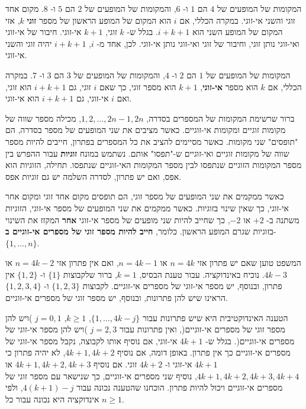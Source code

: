 \documentclass[12pt,a4paper]{article}
\begin{document}
המקומות של המופעים של
$4$
הם
$1$
ו-
$6$,
והמקומות של המופעים של
$2$
הם
$5$
ו-
$8$.
מקום אחד זוגי והשני אי-זוגי. במקרה הכללי, אם
$i$
הוא המקום של המופע הראשון של מספר
\textbf{זוגי}
$k$,
אזי המקום של המופע השני הוא
$i+k+1$.
בגלל ש-
$k$
זוגי,
$k+1$
אי-זוגי. חיבור של אי-זוגי ואי-זוגי נותן זוגי, וחיבור של זוגי ואי-זוגי נותן אי-זוגי. לכן, אחד מ-
$i$, $i+k+1$
יהיה זוגי והשני אי-זוגי.


המקומות של המופעים של
$1$
הם
$2$
ו-
$4$,
והמקומות של המופעים של
$3$
הם
$3$
ו-
$7$.
במקרה הכללי, אם
$k$
הוא מספר
\textbf{אי-זוגי},
$k+1$
הוא מספר זוגי, כך שאם
$i$
זוגי, גם
$i+k+1$
הוא זוגי, ואם
$i$
אי-זוגי, גם
$i+k+1$
הוא אי-זוגי.

ברור שרשימת המקומות של המספרים בסדרה,
$1,2,\ldots,2n-1,2n$,
מכילה מספר שווה של מקומות זוגיים ומקומות אי-זוגיים. כאשר מציבים את שני המופעים של מספר בסדרה, הם "תופסים" שני מקומות. כאשר מסיימים להציב את כל המספרים בפתרון, חייבים להיות מספר שווה של מקומות זוגיים ואי-זוגיים ש-"תפסו" אותם. נשתמש במונח
\textbf{זוגיות}
עבור ההפרש בין מספר המקומות הזוגיים שנתפסו לבין מספר המקומות האי-זוגיים שנתפסו. תחילה, הזוגיות הוא אפס, ואם יש פתרון, לסדרה השלמה יש גם זוגיות אפס.

כאשר ממקמים את שני המופעים של מספר זוגי, הם תופסים מקום אחד זוגי ומקום אחר אי-זוגי, כך שאין שינוי בזוגיות. כאשר ממקמים את שני המופעים של מספר אי-זוגי, הזוגיות משתנה ב-
$+2$
או
$-2$,
כך שחייב להיות שני מופעים של מספר אי-זוגי
\textbf{אחר}
המקזז את השינוי בזוגיות שגרם המופע הראשון. כלומר,
\textbf{חייב להיות מספר זוגי של מספרים אי-זוגיים ב}-%
$\{1,\ldots,n\}$.

המשפט טוען שאם יש פתרון אזי
$n=4k$
או
$n=4k-1$,
ואם אין פתרון אזי
$n=4k-2$
או
$4k-3$.
נוכיח באינדוקציה. עבור טענת הבסיס,
$k=1$,
ברור שלקבוצות
$\{1\}$
ו-
$\{1,2\}$
אין פתרון, ובנוסף, יש מספר אי-זוגי של מספרים אי-זוגיים. לקבוצות
$\{1,2,3\}$
ו-
$\{1,2,3,4\}$
הראינו שיש להן פתרונות, ובנוסף, יש מספר זוגי של מספרים אי-זוגיים.

הטענה האינדוקטיבית היא שיש פתרונות עבור 
$\{1,\ldots,4k-j\}$, $k\ge 1$, $j=0,1$
)ויש להן מספר זוגי של מספרים אי-זוגיים(, ואין פתרונות עבור
$j=2,3$
)ויש להן מספר אי-זוגי של מספרים אי-זוגיים(. בגלל ש-
$4k+1$
אי-זוגי, אם נוסיף אותו לקבוצה, נקבל מספר אי-זוגי של מספרים אי-זוגיים כך אין פתרון. באופן דומה, אם נוסיף
$4k+1,4k+2$,
לא יהיה פתרון כי 
$4k+1$
אי-זוגי ו-
$4k+2$
זוגי. אם נוסיף
$4k+1,4k+2,4k+3$
או
$4k+1,4k+2,4k+3,4k+4$,
נוסיף שני מספרים אי-זוגיים, כך שנישאר עם מספר זוגי של מספרים אי-זוגיים ויכול להיות פתרון. הוכחנו שהטענה נכונה עבור
$4(k+1)-j$,
ולפי אינדוקציה היא נכונה עבור כל
$n\ge 1$.

\newpage
\end{document}
